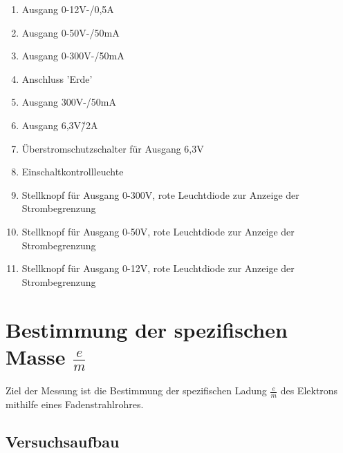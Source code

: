 \documentclass[12pt,a4paper]{article}
\begin{document}
\begin{enumerate}
\item	Ausgang 0-12V-/0,5A

\item	Ausgang 0-50V-/50mA

\item	Ausgang 0-300V-/50mA

\item	Anschluss 'Erde'

\item	Ausgang 300V-/50mA

\item	Ausgang 6,3V\~/2A

\item	Überstromschutzschalter für Ausgang 6,3V

\item	Einschaltkontrollleuchte

\item	Stellknopf für Ausgang 0-300V, rote Leuchtdiode zur Anzeige der Strombegrenzung

\item	Stellknopf für Ausgang 0-50V, rote Leuchtdiode zur Anzeige der Strombegrenzung

\item	Stellknopf für Ausgang 0-12V, rote Leuchtdiode zur Anzeige der Strombegrenzung
\end{enumerate}
\newpage
\section{Bestimmung der spezifischen Masse $\frac{e}{m}$}
Ziel der Messung ist die Bestimmung der spezifischen Ladung $\frac{e}{m}$ des Elektrons mithilfe eines Fadenstrahlrohres.

\subsection{Versuchsaufbau}
\end{document}
